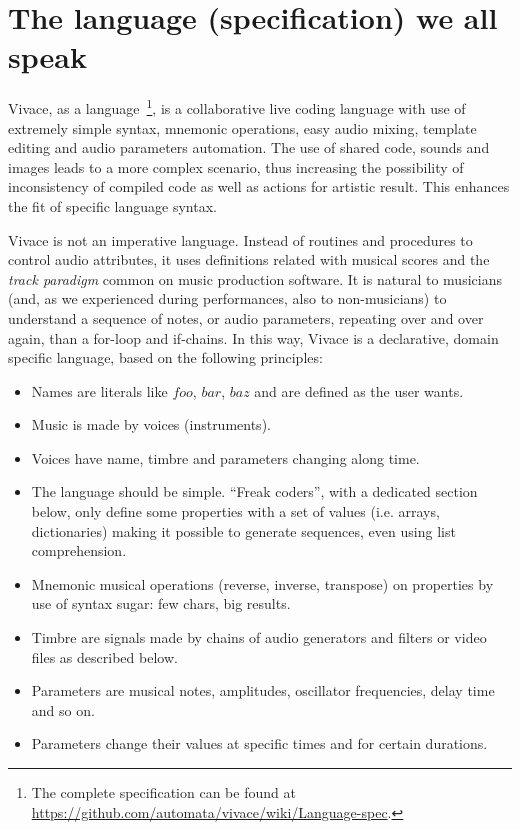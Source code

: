 \documentclass[letterpaper, 12pt]{article}
\begin{document}
\section{The language (specification) we all speak}

Vivace, as a language~\footnote{The complete specification can be
  found at
  \url{https://github.com/automata/vivace/wiki/Language-spec}.}, is a
collaborative live coding language with use of extremely simple
syntax, mnemonic operations, easy audio mixing, template editing and
audio parameters automation. The use of shared code, sounds and images
leads to a more complex scenario, thus increasing the possibility of
inconsistency of compiled code as well as actions for artistic
result. This enhances the fit of specific language syntax.

Vivace is not an imperative language. Instead of routines and
procedures to control audio attributes, it uses definitions related
with musical scores and the \emph{track paradigm} common on music
production software. It is natural to musicians (and, as we
experienced during performances, also to non-musicians) to understand
a sequence of notes, or audio parameters, repeating over and over
again, than a for-loop and if-chains. In this way, Vivace is a
declarative, domain specific language, based on the following
principles:

\begin{itemize}
  
\item Names are literals like $foo$, $bar$, $baz$ and are defined as
  the user wants.
\item Music is made by voices (instruments).
\item Voices have name, timbre and parameters changing along time.
\item The language should be simple. ``Freak coders'', with a
  dedicated section below, only define some properties with a set of
  values (i.e. arrays, dictionaries) making it possible to generate
  sequences, even using list comprehension.
\item Mnemonic musical operations (reverse, inverse, transpose) on
  properties by use of syntax sugar: few chars, big results.
\item Timbre are signals made by chains of audio generators and
  filters or video files as described below.
\item Parameters are musical notes, amplitudes, oscillator
  frequencies, delay time and so on.
\item Parameters change their values at specific times and for certain
  durations.
\end{itemize}
\end{document}
